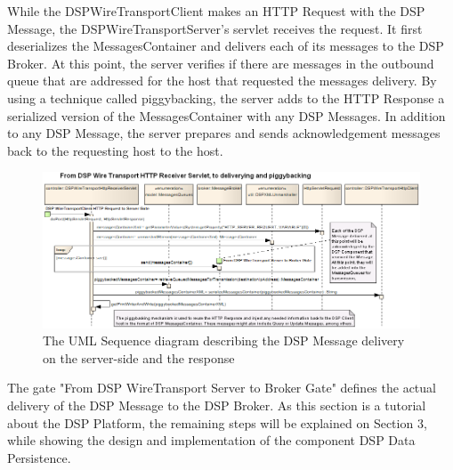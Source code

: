 While the DSPWireTransportClient makes an HTTP Request with the DSP Message,
the DSPWireTransportServer's servlet receives the request. It first
deserializes the MessagesContainer and delivers each of its messages to the DSP
Broker. At this point, the server verifies if there are messages in the
outbound queue that are addressed for the host that requested the messages
delivery. By using a technique called piggybacking, the server adds to the HTTP
Response a serialized version of the MessagesContainer with any DSP Messages.
In addition to any DSP Message, the server prepares and sends acknowledgement
messages back to the requesting host to the host.

\begin{figure}[!t]
  \centering
  \includegraphics[scale=0.5]{../diagrams/From-DSPWireTransport-Server-To-DSP-Broker}
  \caption{The UML Sequence diagram describing the DSP
Message delivery on the server-side and the response}
  \label{fig:From-DSPWireTransport-Server-To-DSP-Broker}
\end{figure}

The gate "From DSP WireTransport Server to Broker Gate" defines the actual
delivery of the DSP Message to the DSP Broker. As this section is a tutorial
about the DSP Platform, the remaining steps will be explained on Section 3,
while showing the design and implementation of the component DSP Data
Persistence.